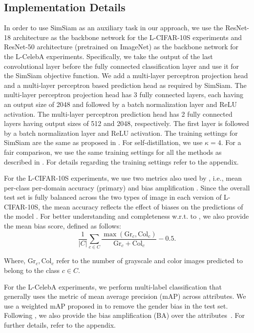 \documentclass[10pt,twocolumn,letterpaper]{article}
\begin{document}
\subsection{Implementation Details} %
In order to use SimSiam as an auxiliary task in our approach, we use the ResNet-18 architecture as the backbone network for the L-CIFAR-10S experiments and ResNet-50 architecture (pretrained on ImageNet) as the backbone network for the L-CelebA experiments. Specifically, we take the output of the last convolutional layer before the fully connected classification layer and use it for the SimSiam objective function. We add a multi-layer perceptron projection head and a multi-layer perceptron based prediction head as required by SimSiam. The multi-layer perceptron projection head has 3 fully connected layers, each having an output size of 2048 and followed by a batch normalization layer and ReLU activation. The multi-layer perceptron prediction head has 2 fully connected layers having output sizes of 512 and 2048, respectively. The first layer is followed by a batch normalization layer and ReLU activation. The training settings for SimSiam are the same as proposed in \cite{chen2020exploring}. For self-distillation, we use $\kappa=4$. For a fair comparison, we use the same training settings for all the methods as described in \cite{wang2020towards}. For details regarding the training settings refer to the appendix. 

For the L-CIFAR-10S experiments, we use two metrics also used by \cite{wang2020towards}, i.e., mean per-class per-domain accuracy (primary) and bias amplification \cite{zhao_men_2017}. Since the overall test set is fully balanced across the two types of image in each version of L-CIFAR-10S, the mean accuracy reflects the effect of biases on the predictions of the model \cite{wang2020towards}. For better understanding and completeness w.r.t. to \cite{wang2020towards}, we also provide the mean bias score, defined as follows:
\begin{equation}
\label{eq:bias}
\frac{1}{|C|}\sum_{c \in C} \frac{\max(\mathrm{Gr}_c, \mathrm{Col}_c)}{\mathrm{Gr}_c + \mathrm{Col}_c} - 0.5.
\end{equation}

Where, $\mathrm{Gr}_c,\mathrm{Col}_c$ refer to the number of grayscale and color images predicted to belong to the class $c\in C$.

For the L-CelebA experiments, we perform multi-label classification that generally uses the metric of mean average precision (mAP) across attributes. We use a weighted mAP proposed in \cite{wang2020towards} to remove the gender bias in the test set. Following \cite{wang2020towards}, we also provide the bias amplification (BA) over the attributes~\cite{zhao_men_2017}. For further details, refer to the appendix. 
\end{document}
